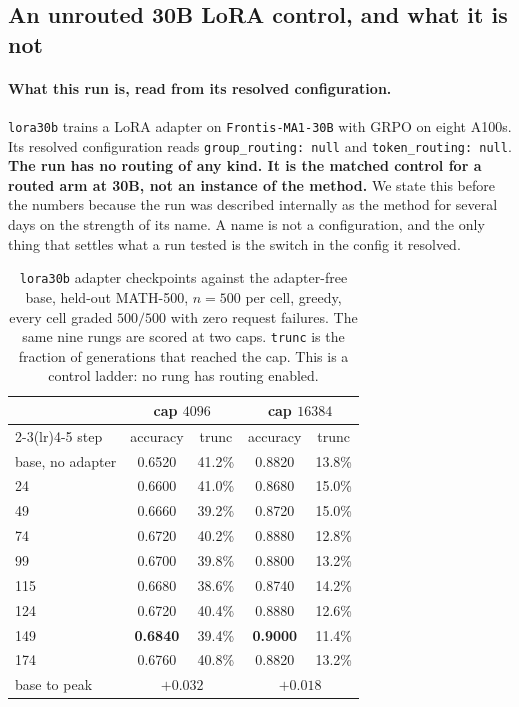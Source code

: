 \subsection{An unrouted 30B LoRA control, and what it is not}
\label{sec:lora30b}

\paragraph{What this run is, read from its resolved configuration.} \texttt{lora30b} trains a
LoRA adapter on \texttt{Frontis-MA1-30B} with GRPO on eight A100s. Its resolved configuration
reads \texttt{group\_routing: null} and \texttt{token\_routing: null}. \textbf{The run has no
routing of any kind. It is the matched control for a routed arm at 30B, not an instance of
the method.} We state this before the numbers because the run was described internally as the
method for several days on the strength of its name. A name is not a configuration, and the
only thing that settles what a run tested is the switch in the config it resolved.

\begin{table}[t]
\centering\small
\caption{\texttt{lora30b} adapter checkpoints against the adapter-free base, held-out
MATH-500, $n=500$ per cell, greedy, every cell graded $500/500$ with zero request failures.
The same nine rungs are scored at two caps. \texttt{trunc} is the fraction of generations
that reached the cap. This is a control ladder: no rung has routing enabled.}
\label{tab:lora30b}
\begin{tabular}{lcccc}
\toprule
 & \multicolumn{2}{c}{cap $4096$} & \multicolumn{2}{c}{cap $16384$} \\
\cmidrule(lr){2-3}\cmidrule(lr){4-5}
step & accuracy & trunc & accuracy & trunc \\
\midrule
base, no adapter & 0.6520 & 41.2\% & 0.8820 & 13.8\% \\
24               & 0.6600 & 41.0\% & 0.8680 & 15.0\% \\
49               & 0.6660 & 39.2\% & 0.8720 & 15.0\% \\
74               & 0.6720 & 40.2\% & 0.8880 & 12.8\% \\
99               & 0.6700 & 39.8\% & 0.8800 & 13.2\% \\
115              & 0.6680 & 38.6\% & 0.8740 & 14.2\% \\
124              & 0.6720 & 40.4\% & 0.8880 & 12.6\% \\
149              & \textbf{0.6840} & 39.4\% & \textbf{0.9000} & 11.4\% \\
174              & 0.6760 & 40.8\% & 0.8820 & 13.2\% \\
\midrule
base to peak     & \multicolumn{2}{c}{$+0.032$} & \multicolumn{2}{c}{$+0.018$} \\
\bottomrule
\end{tabular}
\end{table}

